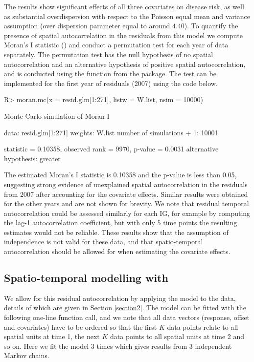 \documentclass[article, nojss]{jss}
\begin{document}
The results show significant effects of all three covariates on disease risk, as well as substantial overdispersion with respect to the Poisson equal mean and variance assumption (over dispersion parameter equal to around $4.40$). To quantify the presence of spatial autocorrelation in the residuals from this model we compute Moran's I statistic (\citealp{moran1950}) and conduct a permutation test for each year of data separately. The permutation test has the null hypothesis of no spatial autocorrelation and an alternative hypothesis of positive spatial autocorrelation, and is conducted using the  function from the  package. The test can be implemented for the first year of residuals (2007) using the code below.

\begin{Schunk}
\begin{Sinput}
R>  moran.mc(x = resid.glm[1:271], listw = W.list, nsim = 10000)
\end{Sinput}
\begin{Soutput}
	Monte-Carlo simulation of Moran I

data:  resid.glm[1:271] 
weights: W.list  
number of simulations + 1: 10001 

statistic = 0.10358, observed rank = 9970, p-value = 0.0031
alternative hypothesis: greater
\end{Soutput}
\end{Schunk}

The estimated Moran's I statistic is 0.10358 and the p-value is less than 0.05, suggesting strong evidence of unexplained spatial autocorrelation in the residuals from 2007 after accounting for the covariate effects. Similar results were obtained for the other years and are not shown for brevity. We note that residual temporal autocorrelation could be assessed similarly for each IG, for example by computing the lag-1 autocorrelation coefficient, but with only 5 time points the resulting estimates would not be reliable. These results show that the assumption of independence is not valid for these data, and that spatio-temporal autocorrelation should be allowed for when estimating the covariate effects. 


\subsection[Spatio-temporal modelling with CARBayesST]{Spatio-temporal modelling with }
We allow for this residual autocorrelation by applying the  model to the data, details of which are given in Section \ref{section2}. The model can be fitted with the following one-line function call, and we note that all data vectors (response, offset and covariates) have to be ordered so that the first $K$ data points relate to all spatial units at time 1, the next $K$ data points to all spatial units at time 2 and so on. Here we fit the model 3 times which gives results from 3 independent Markov chains.
\end{document}
